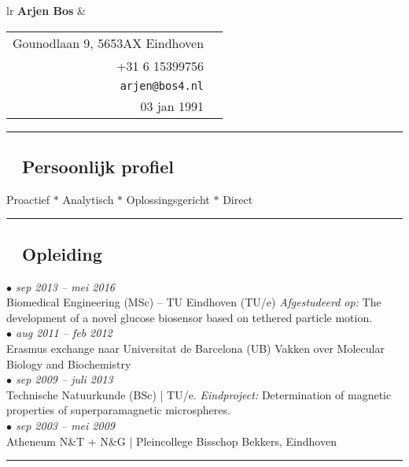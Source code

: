 \documentclass[a4paper,10pt]{article}
\newcommand{\cvsection}[1]{
  \subsection*{{\color{DarkBlue} \textnormal{\faicon{sticky-note}}~ #1}}
}
\newcommand{\cvbullet}[1]{
  \emph{\color{DarkBlue} $\bullet$ #1}
}
\newcommand{\fablue}[1]{
  {\color{DarkBlue} \faicon{#1}}
}
\begin{document}
\begin{tabular}{lr}
  {\color{DarkBlue}\huge {\bf Arjen Bos}} \hspace{17em} &
  \begin{tabular}{rl}
    Gounodlaan 9, 5653AX Eindhoven & \fablue{map-marker}\\ 
    +31 6 15399756 & \fablue{phone}\\
    \verb~arjen@bos4.nl~ & \fablue{envelope}\\
    03 jan 1991 & \fablue{birthday-cake}
  \end{tabular}
\end{tabular}
\vspace{1mm}
\hrule

\begin{multicols}{2}

\subsection*{{\color{DarkBlue} \textnormal{}~ Persoonlijk profiel}}
{Proactief $\ast$ Analytisch $\ast$ Oplossingsgericht $\ast$ Direct \unskip\parfillskip 0pt \par}

\vspace{3mm}
\hrule

\cvsection{Opleiding}
\cvbullet{sep 2013 -- mei 2016}\\
Biomedical Engineering (MSc) -- TU Eindhoven (TU/e)
\emph{Afgestudeerd op:} The development of a novel glucose biosensor based on tethered particle motion.\\
\cvbullet{aug 2011 -- feb 2012}\\
Erasmus exchange naar Universitat de Barcelona (UB) Vakken over Molecular Biology and Biochemistry \\
\cvbullet{sep 2009 -- juli 2013}\\
Technische Natuurkunde (BSc) | TU/e.
\emph{Eindproject:} Determination of magnetic properties of superparamagnetic microspheres.\\
\cvbullet{sep 2003 -- mei 2009}\\
Atheneum N\&T + N\&G | Pleincollege Bisschop Bekkers, Eindhoven

\vspace{3mm}
\hrule


\end{multicols}
\end{document}
